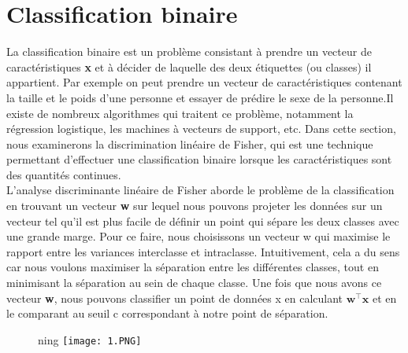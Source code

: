 \section{Classification binaire}
La classification binaire est un  problème consistant à prendre un vecteur de caractéristiques \textbf{x} et à décider de laquelle des deux étiquettes (ou classes) il appartient. Par exemple  on peut prendre un vecteur de caractéristiques contenant la taille et le poids d'une personne et essayer de prédire  le sexe de la personne.Il existe de nombreux algorithmes qui traitent ce problème, notamment la régression logistique, les machines à vecteurs de support, etc.
Dans cette section, nous examinerons la discrimination linéaire de Fisher, qui est une technique permettant d'effectuer une classification binaire lorsque les caractéristiques sont des quantités continues.\\
L'analyse discriminante linéaire de Fisher aborde le problème de la classification en trouvant un vecteur \textbf{w} sur lequel
nous pouvons projeter les données sur un vecteur tel qu'il est plus facile de définir un point qui sépare les deux classes avec une grande marge. Pour ce faire, nous choisissons un vecteur w qui maximise le rapport entre les variances interclasse et intraclasse. Intuitivement, cela a du sens car nous voulons maximiser la séparation entre les différentes classes, tout en minimisant la séparation au sein de chaque classe. Une fois que nous avons ce vecteur \textbf{w}, nous pouvons classifier un point de données x en calculant $\textbf{w}^\intercal \mathbf{x}$ et en le comparant au seuil c correspondant à notre point de séparation.\\
\begin{figure}[h]
    \centeryy ning
    \texttt{[image: 1.PNG]}

    \label{fig:figure 1}
\end{figure}\\

